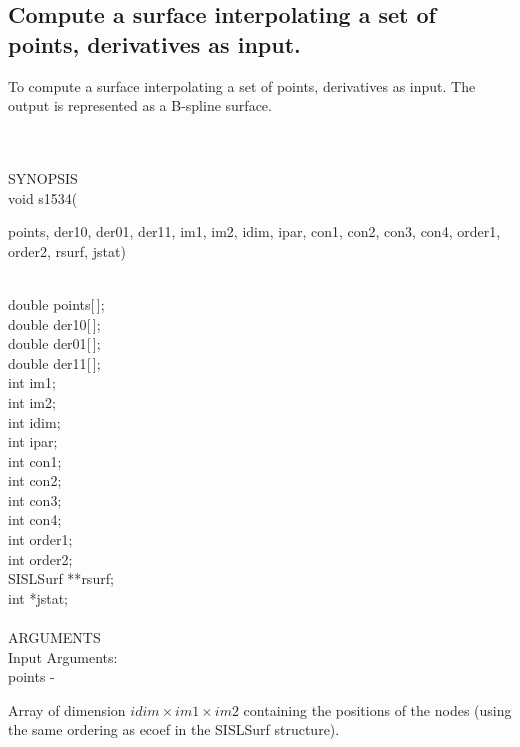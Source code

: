 \subsection{Compute a surface interpolating a set of points,
derivatives as input.}
\begin{minipg1}
  To compute a surface interpolating a set of points, derivatives
  as input.
  The output is represented as a B-spline surface.
\end{minipg1}\\ \\
SYNOPSIS\\
      \>void s1534(\begin{minipg3}
        {\fov points}, {\fov der10}, {\fov der01}, {\fov der11}, {\fov im1}, {\fov im2}, {\fov idim}, {\fov ipar}, {\fov con1}, {\fov con2}, {\fov con3},
        {\fov con4}, {\fov order1},  {\fov order2}, {\fov rsurf}, {\fov jstat})
      \end{minipg3}\\[0.3ex]
      \>\>    double \> {\fov points}[\,];\\
      \>\>    double \> {\fov der10}[\,];\\
      \>\>    double \> {\fov der01}[\,];\\
      \>\>    double \> {\fov der11}[\,];\\
      \>\>    int    \> {\fov im1};\\
      \>\>    int    \> {\fov im2};\\
      \>\>    int    \> {\fov idim};\\
      \>\>    int    \> {\fov ipar};\\
      \>\>    int    \> {\fov con1};\\
      \>\>    int    \> {\fov con2};\\
      \>\>    int    \> {\fov con3};\\
      \>\>    int    \> {\fov con4};\\
      \>\>    int    \> {\fov order1};\\
      \>\>    int    \> {\fov order2};\\
      \>\>    SISLSurf \> **{\fov rsurf};\\
      \>\>    int    \> *{\fov jstat};\\
\\
ARGUMENTS\\
        \>Input Arguments:\\
        \>\>    {\fov points} \> - \>
        \begin{minipg2}
          Array of dimension $idim\times im1\times im2$ containing the
          positions of the nodes (using the same ordering as ecoef in
          the SISLSurf structure).
        \end{minipg2}\\[0.8ex]
